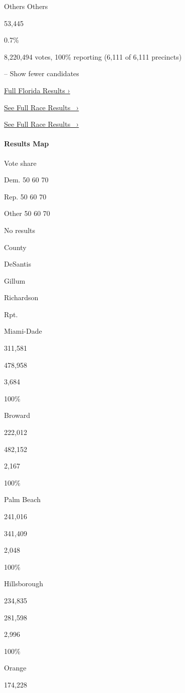  Others Others

53,445

0.7\%

8,220,494 votes, 100\% reporting (6,111 of 6,111 precincts)

-- Show fewer candidates

\href{https://www.nytimes3xbfgragh.onion/interactive/2018/11/06/us/elections/results-florida-elections.html}{Full
Florida Results ›}

\href{https://www.nytimes3xbfgragh.onion/elections/results/florida-governor}{See
Full Race Results~ ›}

\href{https://www.nytimes3xbfgragh.onion/elections/results/florida-governor}{See
Full Race Results~ ›}

\hypertarget{results-map}{%
\paragraph{Results Map}\label{results-map}}

Vote share

Dem. 50 60 70

Rep. 50 60 70

Other 50 60 70

No results

County

DeSantis

Gillum

Richardson

Rpt.

Miami-Dade

311,581

478,958

3,684

100\%

Broward

222,012

482,152

2,167

100\%

Palm Beach

241,016

341,409

2,048

100\%

Hillsborough

234,835

281,598

2,996

100\%

Orange

174,228

